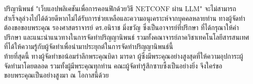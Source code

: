 \hspace*{1.5em}  %
ปริญานิพนธ์ "เว็บแอปพลิเคชันเพื่อการคอนฟิกด้วยวิธี NETCONF ผ่าน LLM" จะไม่สามารถสำเร็จลุล่วงไปได้ด้วยดีหากไม่ได้รับการช่วยเหลือและความอนุเคราะห์จากบุคคลหลายท่าน ทางผู้จัดทำต้องขอขอบพระคุณ รองศาสตราจารย์ ดร.อนิราช มิ่งขวัญ ซึ่งเป็นอาจารย์ที่ปรึกษา ที่ได้กรุณาให้คำปรึกษา และแนะนำแนวทางในการจัดทำปริญญานิพนธ์ รวมทั้งคณาจารย์ภาควิชาเทคโนโลยีสารสนเทศที่ได้ให้ความรู้กับผู้จัดทำเพื่อนำมาประยุกต์ในการจัดทำปริญญานิพนธ์นี้
\\
\hspace*{1.5em}  %
ท้ายที่สุดนี้ ทางผู้จัดทำขอน้อมรำลึกพระคุณบิดา มารดา ผู้ซึ่งมีพระคุณอย่างสูงสุดที่ให้ความอุปการะผู้จัดทำมาโดยตลอด รวมทั้งผู้มีพระคุณทุกท่าน คณะผู้จัดทำรู้สึกซาบซึ้งเป็นอย่างยิ่ง จึงใคร่ขอขอบพระคุณเป็นอย่างสูงมา ณ โอกาสนี้ด้วย
\\
\begin{flushright}

\end{flushright}